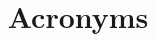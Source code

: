 \documentclass[a4paper]{paper}
\title{Acronyms}
\begin{document}
\maketitle
\printglossaries
\glsaddallunused
\end{document}
